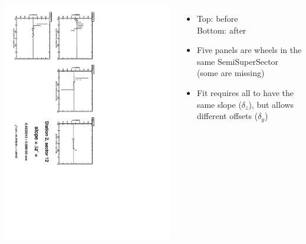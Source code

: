 \documentclass[compress]{beamer}
\begin{document}
\begin{frame}
\begin{columns}
\vfill
\includegraphics[height=\linewidth, angle=90]{zfits_after/zfit_2_12.pdf}
\begin{itemize}
\item Top: before \\ Bottom: after
\item Five panels are wheels in the same SemiSuperSector (some are missing)
\item Fit requires all to have the same slope ($\delta_z$), but allows different offsets ($\delta_y$)
\end{itemize}
\end{columns}
\end{frame}
\end{document}
